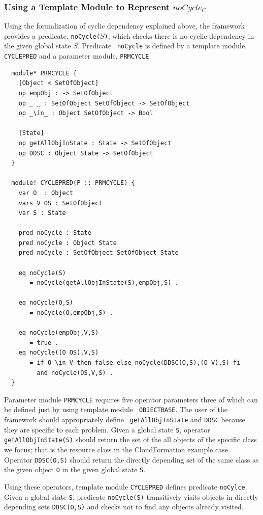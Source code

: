 \documentclass[12pt]{report}
\newcommand{\stt}[1]{{\small{\tt {#1}}}}
\begin{document}
\subsubsection{Using a Template Module to Represent $noCycle_C$}
Using the formalization of cyclic dependency explained above, the
framework provides a predicate, \stt{noCycle($S$)}, which checks there
is no cyclic dependency in the given global state $S$\!. Predicate {\tt
  noCycle} is defined by a template module, {\tt CYCLEPRED} and a
parameter module, {\tt PRMCYCLE}:
\small
\begin{verbatim}
  module* PRMCYCLE {
    [Object < SetOfObject]
    op empObj : -> SetOfObject
    op _ _ : SetOfObject SetOfObject -> SetOfObject
    op _\in_ : Object SetOfObject -> Bool
  
    [State]
    op getAllObjInState : State -> SetOfObject
    op DDSC : Object State -> SetOfObject
  }

  module! CYCLEPRED(P :: PRMCYCLE) {
    var O  : Object
    vars V OS : SetOfObject
    var S : State
  
    pred noCycle : State
    pred noCycle : Object State
    pred noCycle : SetOfObject SetOfObject State
  
    eq noCycle(S)
       = noCycle(getAllObjInState(S),empObj,S) .
  
    eq noCycle(O,S)
       = noCycle(O,empObj,S) .
  
    eq noCycle(empObj,V,S)
       = true .
    eq noCycle((O OS),V,S)
       = if O \in V then false else noCycle(DDSC(O,S),(O V),S) fi
         and noCycle(OS,V,S) .
  }
\end{verbatim}
\normalsize
Parameter module {\tt PRMCYCLE} requires five operator parameters
three of which can be defined just by using template module {\tt
  OBJECTBASE}.
The user of the framework should appropriately define {\tt
  getAllObjInState} and {\tt DDSC} because they are specific to each
problem. 
Given a global state {\tt S}, operator \stt{getAllObjInState(S)} should return
the set of the all objects of the specific class we focus; that is the
resource class in the CloudFormation example case. Operator
\stt{DDSC(O,S)} should return the directly depending set of the same class
as the given object {\tt O} in the given global state {\tt S}.

Using these operators, template module {\tt CYCLEPRED} defines predicate
{\tt noCylce}. Given
a global state {\tt S}, predicate \stt{noCycle(S)} transitively visits objects in
directly depending sets \stt{DDSC(O,S)} and checks not to find any
objects already visited.
\end{document}
